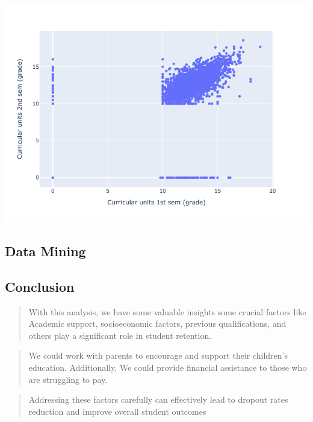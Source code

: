 \documentclass[
  letterpaper,
  DIV=11,
  numbers=noendperiod]{scrartcl}
\begin{document}
\includegraphics{report_AzadhdhinNedalYunisAlFraijat_files/figure-pdf/cell-51-output-1.png}

\hypertarget{data-mining}{%
\subsection{Data Mining}\label{data-mining}}

\hypertarget{conclusion}{%
\subsection{\texorpdfstring{\textbf{Conclusion}}{Conclusion}}\label{conclusion}}

\begin{quote}
With this analysis, we have some valuable insights some crucial factors
like Academic support, socioeconomic factors, previous qualifications,
and others play a significant role in student retention.
\end{quote}

\begin{quote}
We could work with parents to encourage and support their children's
education. Additionally, We could provide financial assistance to those
who are struggling to pay.
\end{quote}

\begin{quote}
Addressing these factors carefully can effectively lead to dropout rates
reduction and improve overall student outcomes
\end{quote}


\printbibliography
\end{document}
